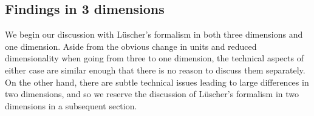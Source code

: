 \subsection{Findings in 3 dimensions}
We begin our discussion with L\"uscher's formalism in both three dimensions and one dimension.  Aside from the obvious change in units and reduced dimensionality when going from three to one dimension, the technical aspects of either case are similar enough that there is no reason to discuss them separately.  On the other hand, there are subtle technical issues leading to large differences in two dimensions, and so we reserve the discussion of L\"uscher's formalism in two dimensions in a subsequent section.




